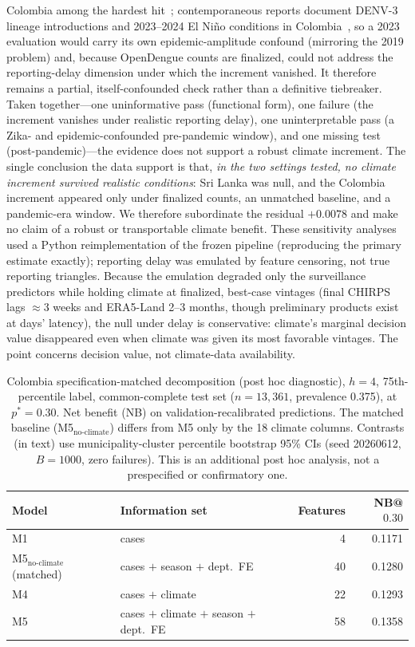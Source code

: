 \documentclass[11pt,a4paper]{article}
\begin{document}
Colombia among the hardest hit~\cite{PAHO2023}; contemporaneous reports document DENV-3 lineage introductions and 2023--2024 El Ni\~no conditions in Colombia~\cite{ValleDelCauca2024}, so a 2023 evaluation would carry its own epidemic-amplitude confound (mirroring the 2019 problem) and, because OpenDengue counts are finalized, could not address the reporting-delay dimension under which the increment vanished. It therefore remains a partial, itself-confounded check rather than a definitive tiebreaker. Taken together---one uninformative pass (functional form), one failure (the increment vanishes under realistic reporting delay), one uninterpretable pass (a Zika- and epidemic-confounded pre-pandemic window), and one missing test (post-pandemic)---the evidence does not support a robust climate increment. The single conclusion the data support is that, \emph{in the two settings tested, no climate increment survived realistic conditions}: Sri Lanka was null, and the Colombia increment appeared only under finalized counts, an unmatched baseline, and a pandemic-era window. We therefore subordinate the residual $+0.0078$ and make no claim of a robust or transportable climate benefit. These sensitivity analyses used a Python reimplementation of the frozen pipeline (reproducing the primary estimate exactly); reporting delay was emulated by feature censoring, not true reporting triangles. Because the emulation degraded only the surveillance predictors while holding climate at finalized, best-case vintages (final CHIRPS lags $\approx$3 weeks and ERA5-Land 2--3 months, though preliminary products exist at days' latency), the null under delay is conservative: climate's marginal decision value disappeared even when climate was given its most favorable vintages. The point concerns decision value, not climate-data availability.

\begin{table}[H]
\centering
\caption{Colombia specification-matched decomposition (post hoc diagnostic), $h=4$, 75th-percentile label, common-complete test set ($n=13{,}361$, prevalence 0.375), at $p^*=0.30$. Net benefit (NB) on validation-recalibrated predictions. The matched baseline (M5$_{\text{no-climate}}$) differs from M5 only by the 18 climate columns. Contrasts (in text) use municipality-cluster percentile bootstrap 95\% CIs (seed 20260612, $B=1000$, zero failures). This is an additional post hoc analysis, not a prespecified or confirmatory one.}
\label{tab:matcheddecomp}
\begin{tabular}{llrr}
\toprule
Model & Information set & Features & NB@$0.30$ \\
\midrule
M1 & cases & 4 & 0.1171 \\
M5$_{\text{no-climate}}$ (matched) & cases $+$ season $+$ dept.\ FE & 40 & 0.1280 \\
M4 & cases $+$ climate & 22 & 0.1293 \\
M5 & cases $+$ climate $+$ season $+$ dept.\ FE & 58 & 0.1358 \\
\bottomrule
\end{tabular}
\end{table}
\end{document}
